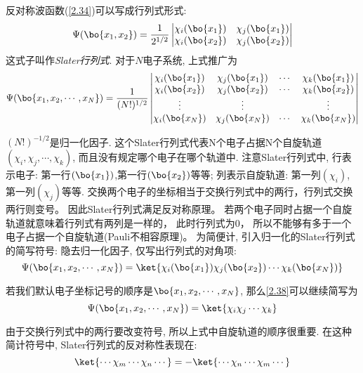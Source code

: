 反对称波函数(\autoref{2.34})可以写成行列式形式:
\begin{equation}
\Psi(\bo{x_1,x_2})=\frac{1}{2^{1/2}}
\begin{vmatrix}
\chi_i(\bo{x_1})&\chi_j(\bo{x_1})\\
\chi_i(\bo{x_2})&\chi_j(\bo{x_2})
\end{vmatrix}
\end{equation}
这式子叫作\emph{Slater行列式}.
对于$N$电子系统, 
上式推广为
\begin{equation}
\Psi(\bo{x_1,x_2,\cdots,x_N})=\frac{1}{(N!)^{1/2}}
\begin{vmatrix}
\chi_i(\bo{x_1})&\chi_j(\bo{x_1})&\cdots&\chi_k(\bo{x_1})\\
\chi_i(\bo{x_2})&\chi_j(\bo{x_2})&\cdots&\chi_k(\bo{x_2})\\
\vdots			&\vdots			& \,&\vdots\\
\chi_i(\bo{x_N})&\chi_j(\bo{x_N})&\cdots&\chi_k(\bo{x_N})
\end{vmatrix}
\end{equation}

$(N!)^{-1/2}$是归一化因子. 
这个Slater行列式代表N个电子占据N个自旋轨道$(\chi_i,\chi_j,\cdots,\chi_k)$, 
而且没有规定哪个电子在哪个轨道中. 
注意Slater行列式中, 行表示电子: 第一行$(\bo{x_1})$,第一行$(\bo{x_2})$等等; 
列表示自旋轨道: 第一列$(\chi_i)$,第一列$(\chi_j)$等等. 
交换两个电子的坐标相当于交换行列式中的两行，行列式交换两行则变号。
因此Slater行列式满足反对称原理。
若两个电子同时占据一个自旋轨道就意味着行列式有两列是一样的，
此时行列式为$0$，
所以不能够有多于一个电子占据一个自旋轨道(Pauli不相容原理)。
为简便计, 引入归一化的Slater行列式的简写符号: 隐去归一化因子, 仅写出行列式的对角项:
\begin{equation}
\label{2.38}
\Psi(\bo{x_1,x_2,\cdots,x_N})=\ket{\chi_i(\bo{x_1})\chi_j(\bo{x_2})\cdots\chi_k(\bo{x_N})}
\end{equation}

若我们默认电子坐标记号的顺序是$\bo{x_1,x_2,\cdots,x_N}$, 
那么\autoref{2.38}可以继续简写为
\begin{equation}
\Psi(\bo{x_1,x_2,\cdots,x_N})=\ket{\chi_i\chi_j\cdots\chi_k}
\end{equation}

由于交换行列式中的两行要改变符号, 
所以上式中自旋轨道的顺序很重要. 
在这种简计符号中, 
Slater行列式的反对称性表现在:
\begin{equation}
\ket{\cdots\chi_m\cdots\chi_n\cdots}=-\ket{\cdots\chi_n\cdots\chi_m\cdots}
\end{equation}

